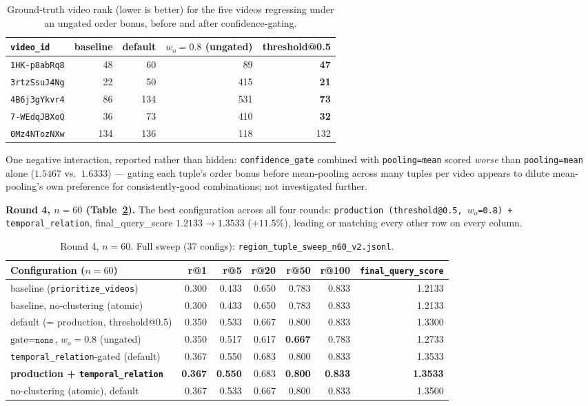 \documentclass[11pt]{article}
\newcommand{\code}[1]{\texttt{\small #1}}
\newcommand{\file}[1]{\texttt{\footnotesize #1}}
\begin{document}
\begin{table}[h]
\centering\small
\begin{tabular}{@{}lrrrr@{}}
\toprule
\code{video\_id} & baseline & default & $w_o{=}0.8$ (ungated) & \textbf{threshold@0.5} \\
\midrule
\code{1HK-p8abRq8} & 48 & 60 & 89 & \textbf{47} \\
\code{3rtzSsuJ4Ng} & 22 & 50 & 415 & \textbf{21} \\
\code{4B6j3gYkvr4} & 86 & 134 & 531 & \textbf{73} \\
\code{7-WEdqJBXoQ} & 36 & 73 & 410 & \textbf{32} \\
\code{0Mz4NTozNXw} & 134 & 136 & 118 & 132 \\
\bottomrule
\end{tabular}
\caption{Ground-truth video rank (lower is better) for the five videos regressing
under an ungated order bonus, before and after confidence-gating.}
\label{tab:tuple-regression-fix}
\end{table}

\noindent One negative interaction, reported rather than hidden:
\code{confidence\_gate} combined with \code{pooling=mean} scored \emph{worse}
than \code{pooling=mean} alone ($1.5467$ vs.\ $1.6333$) --- gating each
tuple's order bonus before mean-pooling across many tuples per video appears
to dilute mean-pooling's own preference for consistently-good combinations;
not investigated further.

\textbf{Round 4, $n=60$ (Table~\ref{tab:tuple-n60}).} The best configuration across all four
rounds: \code{production (threshold@0.5, $w_o$=0.8) + temporal\_relation}, final\_query\_score
$1.2133\to1.3533$ ($+11.5\%$), leading or matching every other row on every column.

\begin{table}[h]
\centering\small
\begin{tabular}{@{}lrrrrrr@{}}
\toprule
Configuration ($n=60$) & r@1 & r@5 & r@20 & r@50 & r@100 & \code{final\_query\_score} \\
\midrule
baseline (\code{prioritize\_videos}) & 0.300 & 0.433 & 0.650 & 0.783 & 0.833 & 1.2133 \\
baseline, no-clustering (atomic) & 0.300 & 0.433 & 0.650 & 0.783 & 0.833 & 1.2133 \\
default (= production, threshold@0.5) & 0.350 & 0.533 & 0.667 & 0.800 & 0.833 & 1.3300 \\
$\mathrm{gate}{=}\code{none}$, $w_o{=}0.8$ (ungated) & 0.350 & 0.517 & 0.617 & \textbf{0.667} & 0.783 & 1.2733 \\
\code{temporal\_relation}-gated (default) & 0.367 & 0.550 & 0.683 & 0.800 & 0.833 & 1.3533 \\
\textbf{production + \code{temporal\_relation}} & \textbf{0.367} & \textbf{0.550} & 0.683 & \textbf{0.800} & \textbf{0.833} & \textbf{1.3533} \\
no-clustering (atomic), default & 0.367 & 0.533 & 0.667 & 0.800 & 0.833 & 1.3500 \\
\bottomrule
\end{tabular}
\caption{Round 4, $n=60$. Full sweep (37 configs): \file{region\_tuple\_sweep\_n60\_v2.jsonl}.}
\label{tab:tuple-n60}
\end{table}
\end{document}
